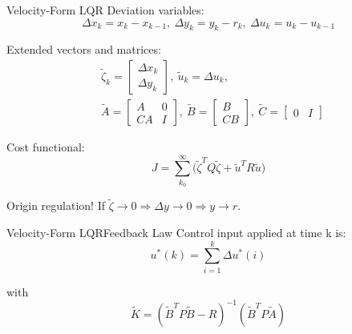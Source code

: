\begin{frame}{Velocity-Form LQR}
	Deviation variables:
	\begin{equation}\label{eq:VelocityVariables}
		\Delta x_k = x_k - x_{k-1}, \ \Delta y_k = y_k - r_k, \ \Delta u_k = u_k-u_{k-1}
	\end{equation}
	
	Extended vectors and matrices:
	\begin{equation} \label{eq1}
		\begin{split}
			& \tilde{\zeta}_k = \begin{bmatrix} \Delta x_k \\ \Delta y_k	\end{bmatrix}, \ \tilde{u}_k = \Delta u_k, \\
			&\tilde{A} = \begin{bmatrix} A & 0 \\ CA & I	\end{bmatrix}, \ 
			\tilde{B} = \begin{bmatrix} B \\ CB	\end{bmatrix}, \ \tilde{C} = \begin{bmatrix} 0 & I	\end{bmatrix}
		\end{split}
	\end{equation}

	Cost functional:
	\begin{equation}\label{eq:LagrangeProblemDeviation}
		J = \sum_{k_0}^{\infty} \big(\tilde{\zeta}^TQ\tilde{\zeta} + \tilde{u}^TR\tilde{u}\big)
	\end{equation}

	Origin regulation! If $\tilde{\zeta} \rightarrow 0 \Rightarrow  \Delta y \rightarrow 0 \Rightarrow  y \rightarrow r$.
\end{frame}


\begin{frame}{Velocity-Form LQR}{Feedback Law}
	Control input applied at time k is:
	\begin{equation}\label{eq:ActualControlApplied}
		u^*(k) = \sum_{i=1}^{k} \Delta u^*(i)
	\end{equation}

	with
	\begin{equation}
		\tilde{K} = (\tilde{B}^TP\tilde{B}-R)^{-1}(\tilde{B}^TP\tilde{A})
	\end{equation}
\end{frame}


